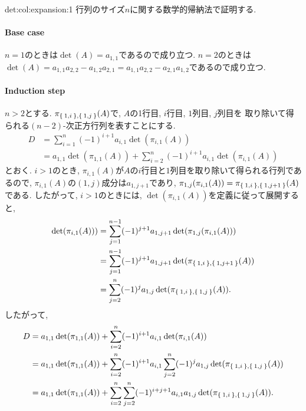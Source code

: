 \begin{proofof}{det:col:expansion:1}
  行列のサイズ$n$に関する数学的帰納法で証明する.
  \paragraph{Base case}
  $n=1$のときは$\det(A)=a_{1,1}$であるので成り立つ.
  $n=2$のときは$\det(A)=a_{1,1}a_{2,2}-a_{1,2}a_{2,1}=a_{1,1}a_{2,2}-a_{2,1}a_{1,2}$であるので成り立つ.

  \paragraph{Induction step}
  $n>2$とする.
  $\pi_{\Set{1,i},\Set{1,j}}(A)$で, $A$の1行目, $i$行目, $1$列目, $j$列目を
  取り除いて得られる$(n-2)$-次正方行列を表すことにする.
  \begin{align*}
    D&=\sum_{i=1}^{n}
    (-1)^{i+1}a_{i,1}\det(\pi_{i,1}(A))\\
    &=
    a_{1,1}\det(\pi_{1,1}(A))
    +
    \sum_{i=2}^{n}
    (-1)^{i+1}a_{i,1}\det(\pi_{i,1}(A))
  \end{align*}
  とおく.
  $i>1$のとき,
  $\pi_{i,1}(A)$が$A$の$i$行目と$1$列目を取り除いて得られる行列であるので,
  $\pi_{i,1}(A)$の$(1,j)$成分は$a_{1,j+1}$であり,
  $\pi_{1,j}(\pi_{i,1}(A))=\pi_{\Set{1,i},\Set{1,j+1}}(A)$である.
  したがって, $i>1$のときには,
  $\det(\pi_{i,1}(A))$を定義に従って展開すると,
  \begin{align*}
    \det(\pi_{i,1}(A)))
    &=\sum_{j=1}^{n-1}
    (-1)^{j+1}a_{1,j+1}\det(\pi_{1,j}(\pi_{i,1}(A)))\\
    &=\sum_{j=1}^{n-1}
    (-1)^{j+1}a_{1,j+1}\det(\pi_{\Set{1,i},\Set{1,j+1}}(A))\\
    &=\sum_{j=2}^{n}
    (-1)^{j}a_{1,j}\det(\pi_{\Set{1,i},\Set{1,j}}(A)).
  \end{align*}
  したがって,
  \begin{align*}
    D
    &=
    a_{1,1}\det(\pi_{1,1}(A))
    +
    \sum_{i=2}^{n}
    (-1)^{i+1}a_{i,1}\det(\pi_{i,1}(A))\\
    &=
    a_{1,1}\det(\pi_{1,1}(A))
    +
    \sum_{i=2}^{n}
    (-1)^{i+1}a_{i,1}\sum_{j=2}^{n}
    (-1)^{j}a_{1,j}\det(\pi_{\Set{1,i},\Set{1,j}}(A))
  \\
  &=
  a_{1,1}\det(\pi_{1,1}(A))
  +
    \sum_{i=2}^{n}\sum_{j=2}^{n}
    (-1)^{i+j+1}
    a_{i,1}a_{1,j}\det(\pi_{\Set{1,i},\Set{1,j}}(A)).
  \end{align*}
  

\end{proofof}
